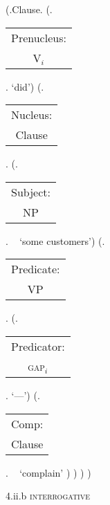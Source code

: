 \documentclass[12pt,letterpaper]{article}
\begin{document}
\begin{figure}
	\begin{center}
		\begin{parsetree}
			(.Clause.
			(.\begin{tabular}{c}Prenucleus:\\V$_i$\end{tabular}. `did')
			(.\begin{tabular}{c}Nucleus:\\Clause\end{tabular}.
			(.\begin{tabular}{c}Subject:\\NP\end{tabular}.  ~ `some customers')
			(.\begin{tabular}{c}Predicate:\\VP\end{tabular}.
			(.\begin{tabular}{c}Predicator:\\\textsc{gap}$_i$\end{tabular}. `---')
			(.\begin{tabular}{c}Comp:\\Clause\end{tabular}. ~  `complain' )
			)
			)
			)
			
			\hfill \break\hfill \break
		\end{parsetree}
		4.ii.b \textsc{interrogative}
	\end{center}
\end{figure}
\end{document}
